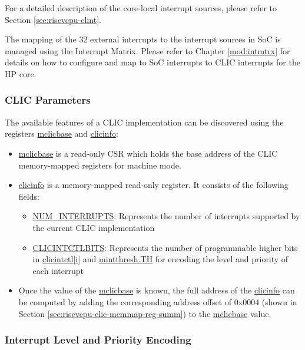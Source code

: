 \documentclass[main\_\_EN.tex]{subfiles}
\begin{document}
For a detailed description of the core-local interrupt sources, please refer to Section \ref{sec:riscvcpu-clint}.

The mapping of the 32 external interrupts to the interrupt sources in SoC is managed using the Interrupt Matrix. Please refer to Chapter \ref{mod:intmtrx} \textit{} for details on how to configure and map to SoC interrupts to CLIC interrupts for the HP core.

\hypertarget{riscvcpu-clic-params}{}
\subsubsection{CLIC Parameters}
\label{sec:riscvcpu-clic-params}

The available features of a CLIC implementation can be discovered using the registers \hyperref[regdesc:MCLICBASE_REG]{mclicbase}
and \hyperref[regdesc:CLICINFO_REG]{clicinfo}:
\begin{itemize}
    \item \hyperref[regdesc:MCLICBASE_REG]{mclicbase} is a read-only CSR which holds the base address of the CLIC memory-mapped registers for machine mode.
    \item \hyperref[regdesc:CLICINFO_REG]{clicinfo} is a memory-mapped read-only register. It consists of the following fields:
    \begin{itemize}
        \item \hyperref[fielddesc:CLICINFO_NUM_INTERRUPTS]{NUM\_INTERRUPTS}: Represents the number of interrupts supported by the current CLIC implementation
        \item \hyperref[fielddesc:CLICINFO_CLICINTCTLBITS]{CLICINTCTLBITS}: Represents the number of programmable higher bits in \hyperref[regdesc:MCLICINTCTL_REG_i]{clicintctl[i]} and \hyperref[fielddesc:MINTTHRESH_TH]{{mintthresh.TH}} for encoding the level and priority of each interrupt
    \end{itemize}
    \item Once the value of the \hyperref[fielddesc:MCLICBASE]{mclicbase} is known, the full address of the  \hyperref[regdesc:CLICINFO_REG]{clicinfo} can be computed by adding the corresponding address offset of 0x0004 (shown in Section \ref{sec:riscvcpu-clic-memmap-reg-summ}) to the \hyperref[fielddesc:MCLICBASE]{mclicbase} value.
\end{itemize}


\hypertarget{riscvcpu-clic-int-level-prio}{}
\subsubsection{Interrupt Level and Priority Encoding}
\label{sec:riscvcpu-clic-int-level-prio}
\end{document}
